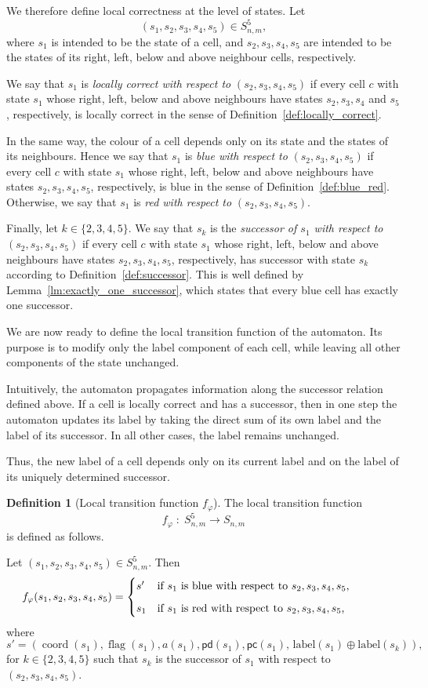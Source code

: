 \documentclass{article}
\theoremstyle{plain}
\theoremstyle{definition}
\newtheorem{definition}[theorem]{Definition}
\DeclareMathOperator{\flag}{flag}
\DeclareMathOperator{\coord}{coord}
\newcommand{\pc}{\mathsf{pc}}
\newcommand{\pd}{\mathsf{pd}}
\begin{document}
We therefore define local correctness at the level of states.
Let 
\[
(s_1,s_2,s_3,s_4,s_5) \in S_{n,m}^5,
\]
where $s_1$ is intended to be
the state of a cell, and $s_2, s_3, s_4, s_5$ are intended to be the
states of its right, left, below and above neighbour cells,
respectively.

We say that $s_1$ is \emph{locally correct with respect to}
$(s_2,s_3,s_4,s_5)$ if every cell $c$ with state $s_1$ whose
right, left, below and above neighbours have states
$s_2, s_3, s_4$ and $s_5$, respectively, is locally correct
in the sense of Definition~\ref{def:locally_correct}.

In the same way, the colour of a cell depends only on its state and the states of its neighbours.
Hence we say that $s_1$ is \emph{blue with respect to}
$(s_2,s_3,s_4,s_5)$ if every cell $c$ with state $s_1$ whose
right, left, below and above neighbours have states
$s_2,s_3,s_4,s_5$, respectively, is blue in the sense of
Definition~\ref{def:blue_red}.  Otherwise, we say that $s_1$ is \emph{red with respect to}
$(s_2,s_3,s_4,s_5)$. 

Finally, let $k \in \{2,3,4,5\}$.  
We say that $s_k$ is the \emph{successor of $s_1$ with respect to} $(s_2, s_3, s_4, s_5)$ if every cell $c$ with state $s_1$ whose
right, left, below and above neighbours have states
$s_2,s_3,s_4,s_5$, respectively, has successor with state $s_k$ according to Definition~\ref{def:successor}. This is well defined by Lemma~\ref{lm:exactly_one_successor}, which
states that every blue cell has exactly one successor.

We are now ready to define the local transition function of the automaton.
Its purpose is to modify only the label component of each cell, while
leaving all other components of the state unchanged.

Intuitively, the automaton propagates information along the
successor relation defined above. If a cell is locally correct and
has a successor, then in one step the automaton updates its label
by taking the direct sum of its own
label and the label of its successor. In all other cases, the label
remains unchanged.

Thus, the new label of a cell depends only on its current label and
on the label of its uniquely determined successor.

\begin{definition}[Local transition function $f_\varphi$]\label{def:local_transition_function}
The local transition function
\[
f_\varphi \; \colon \;S_{n,m}^5 \to S_{n,m}
\]
is defined as follows.

Let $(s_1,s_2,s_3,s_4,s_5) \in S_{n,m}^5$.
Then
\[
f_\varphi(s_1,s_2,s_3,s_4,s_5)
=
\begin{cases}
s'
& \parbox[t]{0.6\linewidth}{%
if $s_1$ is blue with respect to $s_2,s_3,s_4,s_5$,} \\[6pt]
s_1 
& \text{if $s_1$ is red with respect to $s_2,s_3,s_4,s_5$,}
\end{cases}
\]
where
\[
s' = (\coord(s_1),\flag(s_1),a(s_1),\pd(s_1),\pc(s_1),\, \mathrm{label}(s_1) \oplus \mathrm{label}(s_k)),
\]
for 
$k \in \{2,3,4,5\}$ such that $s_k$ is the successor of $s_1$ with respect to $(s_2, s_3, s_4, s_5)$.
\end{definition}
\end{document}
